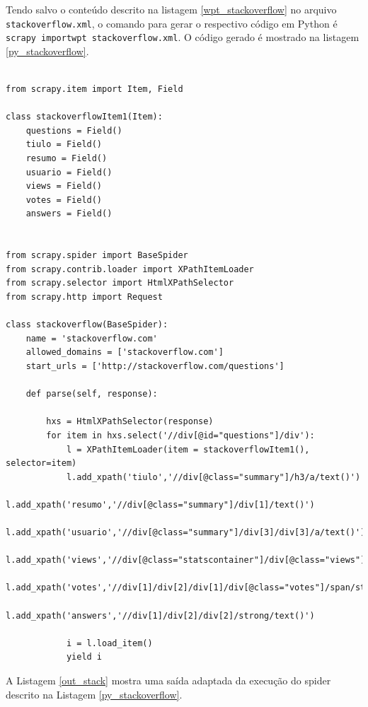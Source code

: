 Tendo salvo o conteúdo descrito na listagem \ref{wpt_stackoverflow} no arquivo \texttt{stackoverflow.xml}, o comando para gerar o respectivo código em Python é \texttt{scrapy importwpt stackoverflow.xml}. O código gerado é mostrado na listagem \ref{py_stackoverflow}.

\begin{lstlisting}[label=py_stackoverflow]

from scrapy.item import Item, Field

class stackoverflowItem1(Item):
    questions = Field()
    tiulo = Field()
    resumo = Field()
    usuario = Field()
    views = Field()
    votes = Field()
    answers = Field()


from scrapy.spider import BaseSpider
from scrapy.contrib.loader import XPathItemLoader
from scrapy.selector import HtmlXPathSelector
from scrapy.http import Request

class stackoverflow(BaseSpider):
    name = 'stackoverflow.com'
    allowed_domains = ['stackoverflow.com']
    start_urls = ['http://stackoverflow.com/questions']

    def parse(self, response):
        
        hxs = HtmlXPathSelector(response)
        for item in hxs.select('//div[@id="questions"]/div'):
            l = XPathItemLoader(item = stackoverflowItem1(), selector=item)
            l.add_xpath('tiulo','//div[@class="summary"]/h3/a/text()')
            l.add_xpath('resumo','//div[@class="summary"]/div[1]/text()')
            l.add_xpath('usuario','//div[@class="summary"]/div[3]/div[3]/a/text()')
            l.add_xpath('views','//div[@class="statscontainer"]/div[@class="views"]/text()')
            l.add_xpath('votes','//div[1]/div[2]/div[1]/div[@class="votes"]/span/strong/text()')
            l.add_xpath('answers','//div[1]/div[2]/div[2]/strong/text()')

            i = l.load_item()
            yield i
\end{lstlisting}

A Listagem \ref{out_stack} mostra uma saída adaptada da execução do spider descrito na Listagem \ref{py_stackoverflow}.

